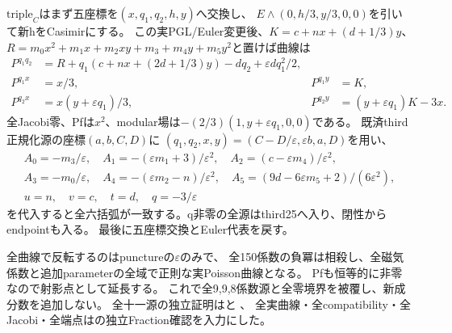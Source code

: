 \documentclass[a4paper,11pt]{ltjsarticle}
\theoremstyle{definition}
\begin{document}
$\mathrm{triple}_C$はまず五座標を$(x,q_1,q_2,h,y)$へ交換し、
$E\wedge(0,h/3,y/3,0,0)$を引いて新hをCasimirにする。
この実PGL/Euler変更後、$K=c+nx+(d+1/3)y$、
$R=m_0x^2+m_1x+m_2xy+m_3+m_4y+m_5y^2$と置けば曲線は
\[
\begin{aligned}
 P^{q_1q_2}&=R+q_1(c+nx+(2d+1/3)y)-dq_2+\varepsilon dq_1^2/2,\\
 P^{q_1x}&=x/3,&P^{q_1y}&=K,\\
 P^{q_2x}&=x(y+\varepsilon q_1)/3,&P^{q_2y}&=(y+\varepsilon q_1)K-3x.
\end{aligned}
\]
全Jacobi零、Pfは$x^2$、modular場は$-(2/3)(1,y+\varepsilon q_1,0,0)$である。
既済third正規化源の座標$(a,b,C,D)$に
$(q_1,q_2,x,y)=(C-D/\varepsilon,\varepsilon b,a,D)$を用い、
\[
\begin{gathered}
 A_0=-m_3/\varepsilon,\quad A_1=-(\varepsilon m_1+3)/\varepsilon^2,
 \quad A_2=(c-\varepsilon m_4)/\varepsilon^2,\\
 A_3=-m_0/\varepsilon,\quad A_4=-(\varepsilon m_2-n)/\varepsilon^2,
 \quad A_5=(9d-6\varepsilon m_5+2)/(6\varepsilon^2),\\
 u=n,\quad v=c,\quad t=d,\quad q=-3/\varepsilon
\end{gathered}
\]
を代入すると全六括弧が一致する。q非零の全源はthird25へ入り、閉性からendpointも入る。
最後に五座標交換とEuler代表を戻す。

全曲線で反転するのはpunctureの$\varepsilon$のみで、
全150係数の負冪は相殺し、全磁気係数と追加parameterの全域で正則な実Poisson曲線となる。
Pfも恒等的に非零なので射影点として延長する。
これで全9,9,8係数源と全零境界を被覆し、新成分数を追加しない。
全十一源の独立証明はと
、
全実曲線・全compatibility・全Jacobi・全端点はの独立Fraction確認を入力にした。
\end{document}
